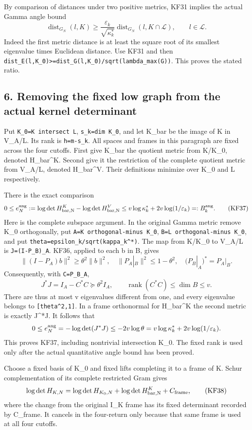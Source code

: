 \documentclass[11pt]{article}
\begin{document}
By comparison of distances under two positive metrics, KF31 implies the actual Gamma angle bound \[
\operatorname{dist}_{G_N}(l,K)
\ge\frac{\varepsilon_k}{\sqrt{\kappa_k^*}}
 \operatorname{dist}_{G_N}(l,K\cap\mathcal L),\qquad l\in\mathcal L.
\tag{KF36}
\] Indeed the first metric distance is at least the square root of its smallest eigenvalue times Euclidean distance. Use KF31 and then \nolinkurl{dist_E(l,K_0)>=dist_G(l,K_0)/sqrt(lambda_max(G))}. This proves the stated ratio.

\subsection{6. Removing the fixed low graph from the actual kernel determinant}\label{removing-the-fixed-low-graph-from-the-actual-kernel-determinant}

Put \nolinkurl{K_0=K intersect L}, \texttt{s\_k=dim\ K\_0}, and let K\_bar be the image of K in V\_A/L. Its rank is \texttt{h=m-s\_k}. All spaces and frames in this paragraph are fixed across the four cutoffs. First give K\_bar the quotient metric from K/K\_0, denoted H\_bar\^{}K. Second give it the restriction of the complete quotient metric from V\_A/L, denoted H\_bar\^{}V. Their definitions minimize over K\_0 and L respectively.

There is the exact comparison \[
0\le e_N^{\rm ang}:=
\log\det H_{\rm bar,N}^K-\log\det H_{\rm bar,N}^V
\le v\log\kappa_k^*+2v\log(1/\varepsilon_k)=:B_k^{\rm ang}.
\tag{KF37}
\] Here is the complete subspace argument. In the original Gamma metric remove K\_0 orthogonally, put \nolinkurl{A=K orthogonal-minus K_0}, \nolinkurl{B=L orthogonal-minus K_0}, and put \nolinkurl{theta=epsilon_k/sqrt(kappa_k^*)}. The map from K/K\_0 to V\_A/L is \texttt{J=(I-P\_B)\textbar{}\_A}. KF36, applied to each b in B, gives \[
\|(I-P_A)b\|^2\ge\theta^2\|b\|^2,
\quad\|P_A|_B\|^2\le1-\theta^2,
\quad(P_B|_A)^*=P_A|_B.
\] Consequently, with \texttt{C=P\_B\textbar{}\_A}, \[
J^*J=I_A-C^*C\succeq\theta^2 I_A,
\qquad \operatorname{rank}(C^*C)\le\dim B\le v.
\] There are thus at most v eigenvalues different from one, and every eigenvalue belongs to \texttt{{[}theta\^{}2,1{]}}. In a frame orthonormal for H\_bar\^{}K the second metric is exactly J\^{}*J. It follows that \[
0\le e_N^{\rm ang}=-\log\det(J^*J)
\le-2v\log\theta
=v\log\kappa_k^*+2v\log(1/\varepsilon_k).
\] This proves KF37, including nontrivial intersection K\_0. The fixed rank is used only after the actual quantitative angle bound has been proved.

Choose a fixed basis of K\_0 and fixed lifts completing it to a frame of K. Schur complementation of its complete restricted Gram gives \[
\log\det H_{K,N}=\log\det H_{K_0,N}
 +\log\det H_{\rm bar,N}^K+C_{\rm frame},
\tag{KF38}
\] where the change from the original I\_K frame has its fixed determinant recorded by C\_frame. It cancels in the four-return only because that same frame is used at all four cutoffs.
\end{document}
